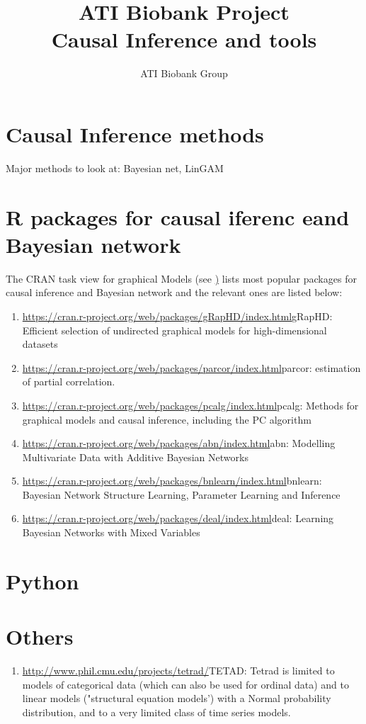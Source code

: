 \documentclass{article}
\begin{document}
\title{ATI Biobank Project \\ Causal Inference and tools}

\author{ATI Biobank Group}

\maketitle

\section{Causal Inference methods}
Major methods to look at: Bayesian net, LinGAM
\section{R packages for causal iferenc eand Bayesian network}
The CRAN task view for graphical Models (see \href{https://cran.r-project.org/web/views/gR.html}) lists most popular packages for causal inference and Bayesian network and the relevant ones are listed below:

\begin{enumerate}
\item \url{https://cran.r-project.org/web/packages/gRapHD/index.html}{gRapHD}: Efficient selection of undirected graphical models for high-dimensional datasets
\item \url{https://cran.r-project.org/web/packages/parcor/index.html}{parcor}: estimation of partial correlation.
\item \url{https://cran.r-project.org/web/packages/pcalg/index.html}{pcalg}: Methods for graphical models and causal inference, including the PC algorithm 
\item \url{https://cran.r-project.org/web/packages/abn/index.html}{abn}: Modelling Multivariate Data with Additive Bayesian Networks
\item \url{https://cran.r-project.org/web/packages/bnlearn/index.html}{bnlearn}: Bayesian Network Structure Learning, Parameter Learning and Inference
\item \url{https://cran.r-project.org/web/packages/deal/index.html}{deal}: Learning Bayesian Networks with Mixed Variables

\end{enumerate}
\section{Python}

\section{Others}
\begin{enumerate}
\item \url{http://www.phil.cmu.edu/projects/tetrad/}{TETAD}: Tetrad is limited to models of categorical data (which can also be used for ordinal data) and to linear models ("structural equation models') with a Normal probability distribution, and to a very limited class of time series models. 

\end{enumerate}




\end{document}
